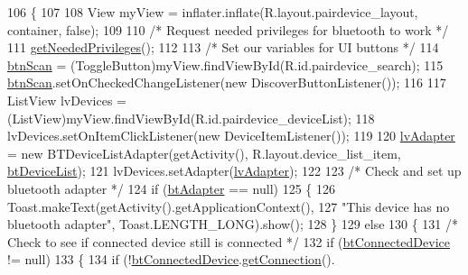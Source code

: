 \begin{DoxyCode}
106                                                                                                       \{
107 
108         View myView = inflater.inflate(R.layout.pairdevice\_layout, container, \textcolor{keyword}{false});
109 
110         \textcolor{comment}{/* Request needed privileges for bluetooth to work */}
111         \hyperlink{classcom_1_1jack_1_1motorbikestatistics_1_1_pair_device_fragment_a5be2be0c93319e38e39cf23943ab1c8c}{getNeededPrivileges}();
112 
113         \textcolor{comment}{/* Set our variables for UI buttons */}
114         \hyperlink{classcom_1_1jack_1_1motorbikestatistics_1_1_pair_device_fragment_a1bf1c9b623a1b9891e0d574006cf8d5f}{btnScan} = (ToggleButton)myView.findViewById(R.id.pairdevice\_search);
115         \hyperlink{classcom_1_1jack_1_1motorbikestatistics_1_1_pair_device_fragment_a1bf1c9b623a1b9891e0d574006cf8d5f}{btnScan}.setOnCheckedChangeListener(\textcolor{keyword}{new} DiscoverButtonListener());
116 
117         ListView lvDevices = (ListView)myView.findViewById(R.id.pairdevice\_deviceList);
118         lvDevices.setOnItemClickListener(\textcolor{keyword}{new} DeviceItemListener());
119 
120         \hyperlink{classcom_1_1jack_1_1motorbikestatistics_1_1_pair_device_fragment_a5ab5efcda2c2fe8db4420ec28ea2840f}{lvAdapter} = \textcolor{keyword}{new} BTDeviceListAdapter(getActivity(), R.layout.device\_list\_item, 
      \hyperlink{classcom_1_1jack_1_1motorbikestatistics_1_1_pair_device_fragment_a422043a997fbe99ca9391440ce8b1180}{btDeviceList});
121         lvDevices.setAdapter(\hyperlink{classcom_1_1jack_1_1motorbikestatistics_1_1_pair_device_fragment_a5ab5efcda2c2fe8db4420ec28ea2840f}{lvAdapter});
122 
123         \textcolor{comment}{/* Check and set up bluetooth adapter */}
124         \textcolor{keywordflow}{if} (\hyperlink{classcom_1_1jack_1_1motorbikestatistics_1_1_pair_device_fragment_ac21b65a91245ae03ebba675e41166ace}{btAdapter} == null)
125         \{
126             Toast.makeText(getActivity().getApplicationContext(),
127                     \textcolor{stringliteral}{"This device has no bluetooth adapter"}, Toast.LENGTH\_LONG).show();
128         \}
129         \textcolor{keywordflow}{else}
130         \{
131             \textcolor{comment}{/* Check to see if connected device still is connected */}
132             \textcolor{keywordflow}{if} (\hyperlink{classcom_1_1jack_1_1motorbikestatistics_1_1_pair_device_fragment_afb95960b8365f4696444ea7683ebbf93}{btConnectedDevice} != null)
133             \{
134                 \textcolor{keywordflow}{if} (!\hyperlink{classcom_1_1jack_1_1motorbikestatistics_1_1_pair_device_fragment_afb95960b8365f4696444ea7683ebbf93}{btConnectedDevice}.\hyperlink{classcom_1_1jack_1_1motorbikestatistics_1_1_b_t_device_item_ac3fbff10e5a5b3142ef648bf186b9be0}{getConnection}().

\end{DoxyCode}
